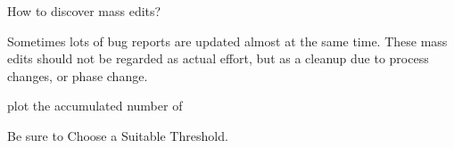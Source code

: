 

\Problem

How to discover mass edits?

\Context

Sometimes lots of bug reports are updated almost at the same time. These mass edits should not be regarded as actual effort, but as a cleanup due to process changes, or phase change.

\Solution

plot the accumulated number of 

\RelatedPatterns

Be sure to Choose a Suitable Threshold.
